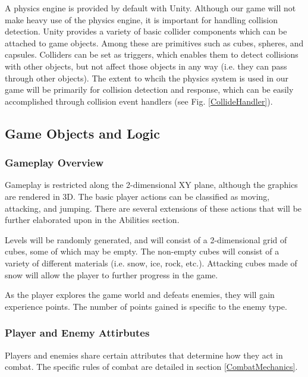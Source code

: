 \documentclass{article}
\begin{document}
A physics engine is provided by default with Unity.  Although our game will not make heavy use of the physics engine, it is important for handling collision detection.  Unity provides a variety of basic collider components which can be attached to game objects.  Among these are primitives such as cubes, spheres, and capsules.  Colliders can be set as triggers, which enables them to detect collisions with other objects, but not affect those objects in any way (i.e. they can pass through other objects).  The extent to whcih the physics system is used in our game will be primarily for collision detection and response, which can be easily accomplished through collision event handlers (see Fig. \ref{CollideHandler}).

\subsection{Game Objects and Logic}

\subsubsection{Gameplay Overview}

Gameplay is restricted along the 2-dimensional XY plane, although the graphics are rendered in 3D.  The basic player actions can be classified as moving, attacking, and jumping.  There are several extensions of these actions that will be further elaborated upon in the Abilities section.

Levels will be randomly generated, and will consist of a 2-dimensional grid of cubes, some of which may be empty.  The non-empty cubes will consist of a variety of different materials (i.e. snow, ice, rock, etc.).  Attacking cubes made of snow will allow the player to further progress in the game.

As the player explores the game world and defeats enemies, they will gain experience points.  The number of points gained is specific to the enemy type.

\subsubsection{Player and Enemy Attirbutes}

Players and enemies share certain attributes that determine how they act in combat.  The specific rules of combat are detailed in section \ref{CombatMechanics}.
\end{document}

